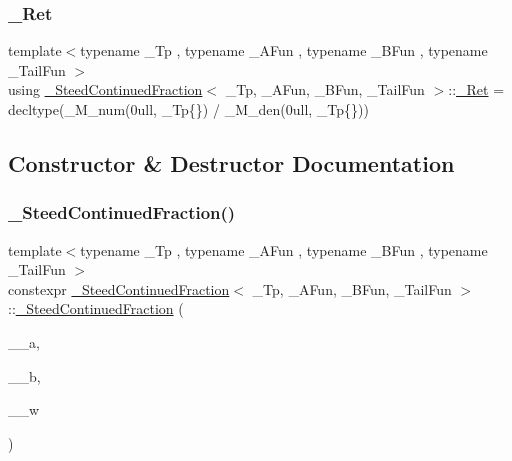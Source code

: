 \mbox{\label{class__SteedContinuedFraction_a9dc0b4a835f6e3c7495889da047a3706}} 
\subsubsection{\texorpdfstring{\+\_\+\+Ret}{\_Ret}}
{\footnotesize\ttfamily template$<$typename \+\_\+\+Tp , typename \+\_\+\+A\+Fun , typename \+\_\+\+B\+Fun , typename \+\_\+\+Tail\+Fun $>$ \\
using \hyperlink{class__SteedContinuedFraction}{\+\_\+\+Steed\+Continued\+Fraction}$<$ \+\_\+\+Tp, \+\_\+\+A\+Fun, \+\_\+\+B\+Fun, \+\_\+\+Tail\+Fun $>$\+::\hyperlink{class__SteedContinuedFraction_a9dc0b4a835f6e3c7495889da047a3706}{\+\_\+\+Ret} =  decltype(\+\_\+\+M\+\_\+num(0ull, \+\_\+\+Tp\{\}) / \+\_\+\+M\+\_\+den(0ull, \+\_\+\+Tp\{\}))}



\subsection{Constructor \& Destructor Documentation}
\mbox{\label{class__SteedContinuedFraction_a4878a856bbc09caaea8fd4cf287d06c5}} 
\subsubsection{\texorpdfstring{\+\_\+\+Steed\+Continued\+Fraction()}{\_SteedContinuedFraction()}}
{\footnotesize\ttfamily template$<$typename \+\_\+\+Tp , typename \+\_\+\+A\+Fun , typename \+\_\+\+B\+Fun , typename \+\_\+\+Tail\+Fun $>$ \\
constexpr \hyperlink{class__SteedContinuedFraction}{\+\_\+\+Steed\+Continued\+Fraction}$<$ \+\_\+\+Tp, \+\_\+\+A\+Fun, \+\_\+\+B\+Fun, \+\_\+\+Tail\+Fun $>$\+::\hyperlink{class__SteedContinuedFraction}{\+\_\+\+Steed\+Continued\+Fraction} (\begin{DoxyParamCaption}\item[{\+\_\+\+A\+Fun}]{\+\_\+\+\_\+a,  }\item[{\+\_\+\+B\+Fun}]{\+\_\+\+\_\+b,  }\item[{\+\_\+\+Tail\+Fun}]{\+\_\+\+\_\+w }\end{DoxyParamCaption})\hspace{0.3cm}{\ttfamily [inline]}}



